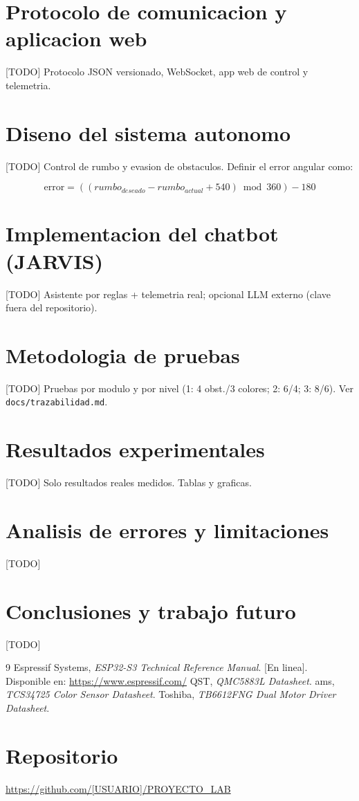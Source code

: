 \documentclass[journal]{IEEEtran}
\begin{document}
\section{Protocolo de comunicacion y aplicacion web}
[TODO] Protocolo JSON versionado, WebSocket, app web de control y telemetria.

\section{Diseno del sistema autonomo}
[TODO] Control de rumbo y evasion de obstaculos. Definir el error angular como:

\begin{equation}
\mathrm{error} = ((rumbo_{deseado} - rumbo_{actual} + 540) \bmod 360) - 180
\label{eq:error_angular}
\end{equation}

\section{Implementacion del chatbot (JARVIS)}
[TODO] Asistente por reglas + telemetria real; opcional LLM externo (clave
fuera del repositorio).

\section{Metodologia de pruebas}
[TODO] Pruebas por modulo y por nivel (1: 4 obst./3 colores; 2: 6/4; 3: 8/6).
Ver \texttt{docs/trazabilidad.md}.

\section{Resultados experimentales}
[TODO] Solo resultados reales medidos. Tablas y graficas.

\section{Analisis de errores y limitaciones}
[TODO]

\section{Conclusiones y trabajo futuro}
[TODO]

\begin{thebibliography}{9}
 Espressif Systems, \emph{ESP32-S3 Technical Reference Manual}.
[En linea]. Disponible en: \url{https://www.espressif.com/}
 QST, \emph{QMC5883L Datasheet}.
 ams, \emph{TCS34725 Color Sensor Datasheet}.
 Toshiba, \emph{TB6612FNG Dual Motor Driver Datasheet}.
\end{thebibliography}

\section*{Repositorio}
\url{https://github.com/[USUARIO]/PROYECTO_LAB}
\end{document}
